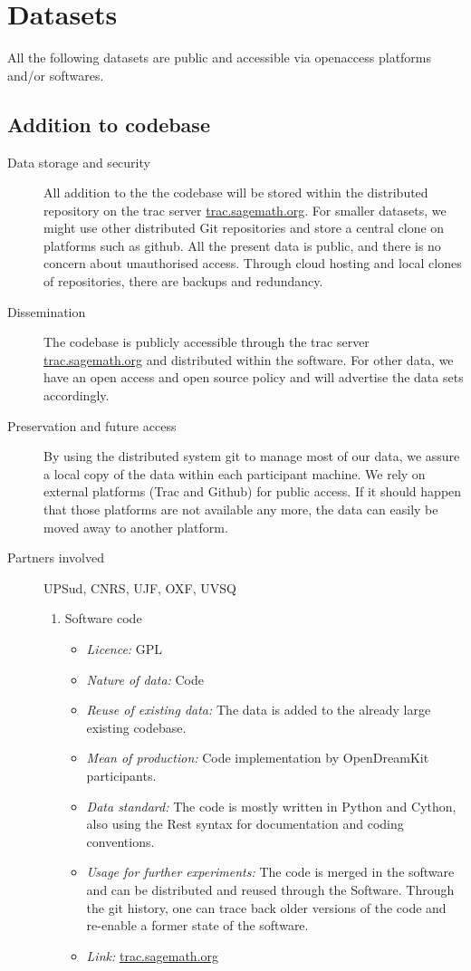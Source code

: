 \documentclass{../../Proposal/LaTeX-proposal/deliverablereport}
\begin{document}
\section{Datasets}
All the following datasets are public and accessible via openaccess platforms and/or softwares.


\subsection{Addition to \Sage codebase}


\begin{description}
\item[Data storage and security] All addition to the the \Sage codebase will be stored within the distributed \Sage repository on the trac server \href{http://trac.sagemath.org/}{trac.sagemath.org}. For smaller datasets, we might use other distributed Git repositories and store a central clone on platforms such as github. All the present data is public, and there is no concern about
unauthorised access. Through cloud hosting and local clones of
repositories, there are backups and redundancy.
\label{Sagesec}
\item[Dissemination] The \Sage codebase is publicly accessible through
  the trac server \href{http://trac.sagemath.org/}{trac.sagemath.org}
  and distributed within the \Sage software. For other data, we have an open access and open source policy and will advertise the data sets accordingly.
\label{Sagediss}
\item[Preservation and future access] By using the distributed system git to manage most of our data, we assure a local copy of the data within each participant machine. We rely on external platforms (Trac and Github) for public access. If it should happen that those platforms are not available any more, the data can easily be moved away to another platform.
\item[Partners involved] UPSud, CNRS, UJF, OXF, UVSQ
\label{Sagepres}


\begin{enumerate}
\item{Software code}
\begin{itemize}
\item\textit{Licence:} GPL
\item\textit{Nature of data:} Code
\item\textit{Reuse of existing data:} The data is added to the already large existing \Sage codebase.
\item\textit{Mean of production:} Code implementation by OpenDreamKit participants.
\item\textit{Data standard:} The code is mostly written in Python and Cython, also using the Rest syntax for documentation and \Sage coding conventions.
\item\textit{Usage for further experiments:} The code is merged in the software and can be distributed and reused through the Software. Through the git history,
one can trace back older versions of the code and re-enable a former state of the software.
\item\textit{Link:} \href{http://trac.sagemath.org/}{trac.sagemath.org}


\end{itemize}
\end{enumerate}
\end{description}
\end{document}
